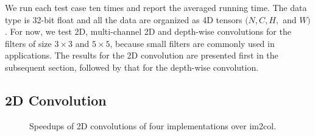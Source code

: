 We run each test case ten times and report the averaged running time. The data type is 32-bit float and all the data are organized as 4D tensors $(N,C,H,$ and $W)$. For
now, we test 2D, multi-channel 2D and depth-wise convolutions for the filters of size $3 \times 3$ and $5 \times 5$, because small filters are commonly used in applications. The results for the 2D convolution are presented first in the subsequent section, followed by that for the depth-wise convolution.

\subsection{2D Convolution}
\begin{figure}
\centering

\hspace{0em}
	
\caption{Speedups of 2D convolutions of four implementations over im2col.}
\label{fig:2druntime}
\end{figure}

